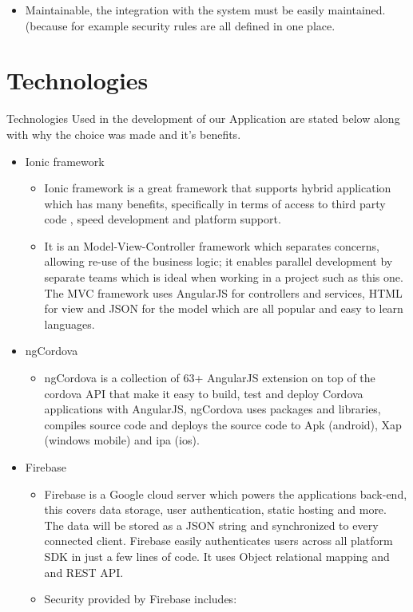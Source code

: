 \documentclass[a4paper,12pt]{article}
\begin{document}
\begin{itemize}
\begin{itemize}
\begin{itemize}
\item Maintainable, the integration with the system must be easily maintained. (because for example security rules are all defined in one place.
\end{itemize}
\end{itemize}

\section{Technologies}
Technologies Used in the development of our Application are stated below along with why the choice was made and it's benefits.
\begin{itemize}
\item Ionic framework
 \begin{itemize}
\item Ionic framework is a great framework that supports hybrid application which has many benefits, specifically in terms of access to third party code , speed development and  platform support.
\item It is an Model-View-Controller framework which separates concerns, allowing re-use of the business logic; it enables parallel development by separate teams which is ideal when working in a project such as this one.  The MVC framework uses AngularJS for controllers and services, HTML for view and JSON for the model which are all popular and easy to learn languages.
 \end{itemize}
\item ngCordova
\begin{itemize}
\item ngCordova is a collection of 63+ AngularJS extension on top of the cordova API that make it easy to build, test and deploy Cordova applications with AngularJS,  ngCordova uses packages and libraries, compiles source code and deploys the source code to Apk (android), Xap (windows mobile) and ipa (ios).
\end{itemize}
\item Firebase
\begin{itemize}
 \item Firebase is a Google cloud server which powers the applications back-end, this covers data storage, user authentication, static hosting and more.  The data will be stored as a JSON string and synchronized to every connected client.  Firebase easily authenticates users across all platform SDK in just a few lines of code.  It uses Object relational mapping and and REST API.
\item Security provided by Firebase includes:

\end{itemize}
\end{itemize}
\end{itemize}
\end{document}
